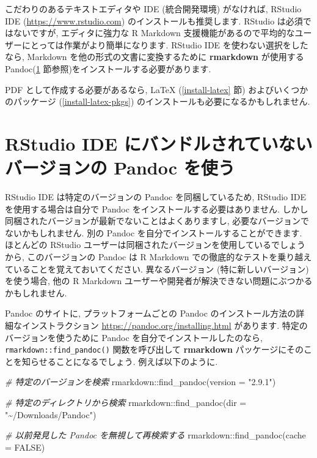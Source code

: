 \documentclass[
  11pt,
]{bxjsreport}
\newenvironment{Shaded}{\begin{snugshade}}{\end{snugshade}}
\newcommand{\AttributeTok}[1]{\textcolor[rgb]{0.77,0.63,0.00}{#1}}
\newcommand{\CommentTok}[1]{\textcolor[rgb]{0.56,0.35,0.01}{\textit{#1}}}
\newcommand{\ConstantTok}[1]{\textcolor[rgb]{0.00,0.00,0.00}{#1}}
\newcommand{\FunctionTok}[1]{\textcolor[rgb]{0.00,0.00,0.00}{#1}}
\newcommand{\NormalTok}[1]{#1}
\newcommand{\SpecialCharTok}[1]{\textcolor[rgb]{0.00,0.00,0.00}{#1}}
\newcommand{\StringTok}[1]{\textcolor[rgb]{0.31,0.60,0.02}{#1}}
\begin{document}
こだわりのあるテキストエディタや IDE (統合開発環境) がなければ, RStudio IDE (\url{https://www.rstudio.com}) のインストールも推奨します. RStudio は必須ではないですが, エディタに強力な R Markdown 支援機能があるので平均的なユーザーにとっては作業がより簡単になります. RStudio IDE を使わない選択をしたなら, Markdown を他の形式の文書に変換するために \textbf{rmarkdown} が使用する Pandoc(\ref{install-pandoc} 節参照)をインストールする必要があります.

PDF として作成する必要があるなら, LaTeX (\ref{install-latex} 節) およびいくつかのパッケージ (\ref{install-latex-pkgs}) のインストールも必要になるかもしれません.

\hypertarget{install-pandoc}{%
\section{RStudio IDE にバンドルされていないバージョンの Pandoc を使う}\label{install-pandoc}}

RStudio IDE は特定のバージョンの Pandoc を同梱しているため, RStudio IDE を使用する場合は自分で Pandoc をインストールする必要はありません. しかし同梱されたバージョンが最新でないことはよくありますし, 必要なバージョンでないかもしれません. 別の Pandoc を自分でインストールすることができます. ほとんどの RStudio ユーザーは同梱されたバージョンを使用しているでしょうから, このバージョンの Pandoc は R Markdown での徹底的なテストを乗り越えていることを覚えておいてください. 異なるバージョン (特に新しいバージョン) を使う場合, 他の R Markdown ユーザーや開発者が解決できない問題にぶつかるかもしれません.

Pandoc のサイトに, プラットフォームごとの Pandoc のインストール方法の詳細なインストラクション \url{https://pandoc.org/installing.html} があります. 特定のバージョンを使うために Pandoc を自分でインストールしたのなら, \texttt{rmarkdown::find\_pandoc()} 関数を呼び出して \textbf{rmarkdown} パッケージにそのことを知らせることになるでしょう. 例えば以下のように.

\begin{Shaded}
\begin{Highlighting}[numbers=left,,]
\CommentTok{\# 特定のバージョンを検索}
\NormalTok{rmarkdown}\SpecialCharTok{::}\FunctionTok{find\_pandoc}\NormalTok{(}\AttributeTok{version =} \StringTok{"2.9.1"}\NormalTok{)}

\CommentTok{\# 特定のディレクトリから検索}
\NormalTok{rmarkdown}\SpecialCharTok{::}\FunctionTok{find\_pandoc}\NormalTok{(}\AttributeTok{dir =} \StringTok{"\textasciitilde{}/Downloads/Pandoc"}\NormalTok{)}

\CommentTok{\# 以前発見した Pandoc を無視して再検索する}
\NormalTok{rmarkdown}\SpecialCharTok{::}\FunctionTok{find\_pandoc}\NormalTok{(}\AttributeTok{cache =} \ConstantTok{FALSE}\NormalTok{)}
\end{Highlighting}
\end{Shaded}
\end{document}
